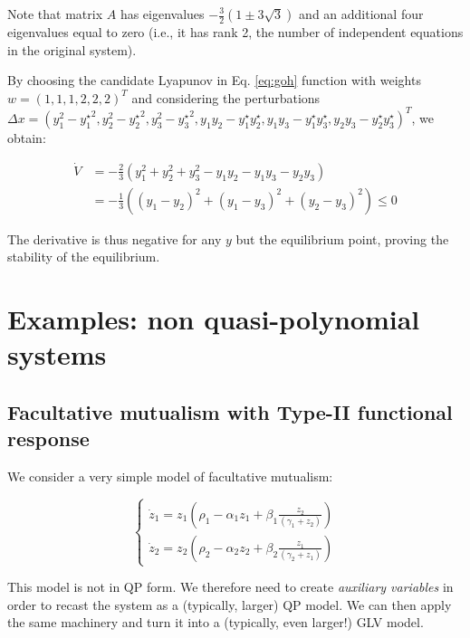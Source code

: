 \documentclass{article}
\begin{document}
Note that matrix \(A\) has eigenvalues
\(-\frac{3}{2}(1 \pm 3 \sqrt{3})\) and an additional four eigenvalues
equal to zero (i.e., it has rank 2, the number of independent equations
in the original system).

By choosing the candidate Lyapunov in Eq. \ref{eq:goh} function with
weights \(w = (1,1,1, 2,2,2)^T\) and considering the perturbations
\(\Delta x = (y_1^2 - {y_1^\star}^2, y_2^2 - {y_2^\star}^2, y_3^2 - {y_3^\star}^2, y_1 y_2 - y_1^\star y_2^\star, y_1 y_3 - y_1^\star y_3^\star, y_2 y_3 - y_2^\star y_3^\star)^T\),
we obtain:

\begin{equation}
\begin{aligned}
\dot{V} &= -\frac{2}{3} \left(y_1^2 + y_2^2 + y_3^2 - y_1 y_2 -y_1 y_3 - y_2 y_3 \right) \\
&=-\frac{1}{3} \left((y_1 - y_2)^2 + (y_1 - y_3)^2 + (y_2 - y_3)^2\right) \leq 0
\end{aligned}
\end{equation}

The derivative is thus negative for any \(y\) but the equilibrium point,
proving the stability of the equilibrium.

\hypertarget{examples-non-quasi-polynomial-systems}{%
\section{Examples: non quasi-polynomial
systems}\label{examples-non-quasi-polynomial-systems}}

\hypertarget{facultative-mutualism-with-type-ii-functional-response}{%
\subsection{Facultative mutualism with Type-II functional
response}\label{facultative-mutualism-with-type-ii-functional-response}}

We consider a very simple model of facultative mutualism:

\begin{equation}
\begin{cases}
\dot{z}_1 = z_1 \left(\rho_1 - \alpha_1 z_1 + \beta_1 \frac{z_2}{(\gamma_1 + z_2)} \right)\\
\dot{z}_2 = z_2 \left(\rho_2 - \alpha_2 z_2 + \beta_2 \frac{z_1}{(\gamma_2 + z_1)} \right)
\end{cases}
\end{equation}

This model is not in QP form. We therefore need to create
\emph{auxiliary variables} in order to recast the system as a
(typically, larger) QP model. We can then apply the same machinery and
turn it into a (typically, even larger!) GLV model.
\end{document}
